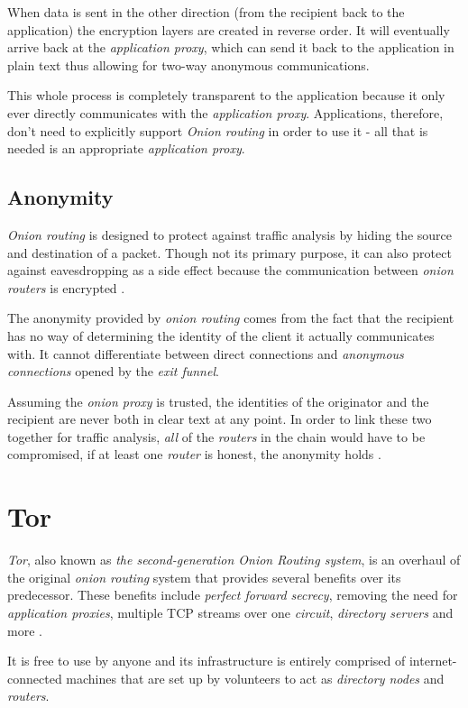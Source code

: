 \documentclass{sig-alternate}
\begin{document}
When data is sent in the other direction (from the recipient back to the application) the encryption layers
are created in reverse order. It will eventually arrive back at the \emph{application proxy}, which can send
it back to the application in plain text thus allowing for two-way anonymous communications.

This whole process is completely transparent to the application because it only ever directly communicates
with the \emph{application proxy}. Applications, therefore, don't need to explicitly support
\emph{Onion routing} in order to use it - all that is needed is an appropriate \emph{application proxy}.

\subsection{Anonymity}
\emph{Onion routing} is designed to protect against traffic analysis by hiding the source and destination of a
packet. Though not its primary purpose, it can also protect against eavesdropping as a side effect because
the communication between \emph{onion routers} is encrypted \cite{reed1998}.

The anonymity provided by \emph{onion routing} comes from the fact that the recipient has no way
of determining the identity of the client it actually communicates with. It cannot differentiate
between direct connections and \emph{anonymous connections} opened by the \emph{exit funnel}.

Assuming the \emph{onion proxy} is trusted, the identities of the originator and the recipient are
never both in clear text at any point. In order to link these two together for traffic analysis,
\emph{all} of the \emph{routers} in the chain would have to be compromised, if at least one
\emph{router} is honest, the anonymity holds \cite{reed1998}.


\section{Tor}
\emph{Tor}, also known as \emph{the second-generation Onion Routing system}, is an
overhaul of the original \emph{onion routing} system that provides several benefits over its predecessor.
These benefits include \emph{perfect forward secrecy}, removing the need for \emph{application proxies},
multiple TCP streams over one \emph{circuit}, \emph{directory servers} and more \cite{tor2004}.

It is free
to use by anyone and its infrastructure is entirely comprised of internet-connected machines that are
set up by volunteers to act as \emph{directory nodes} and \emph{routers}.
\end{document}
